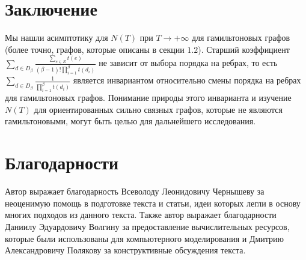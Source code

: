 \documentclass{article}
\newcommand{\squad}{
    \hspace{0.5em}
}
\begin{document}
\section{Заключение}

Мы нашли асимптотику для $N(T)$ при $T \to +\infty$ для гамильтоновых графов (более точно, графов, которые описаны в секции $1.2$).
Старший коэффициент $\sum_{d \in D_{\beta}}\frac{\sum_{e \in E}{t(e)}}{(\beta - 1)!\prod_{i = 1}^{\beta}{t(d_{i})}}$ не зависит от выбора порядка на ребрах, то есть $\sum_{d \in D_{\beta}}\frac{1}{\prod_{i = 1}^{\beta}{t(d_{i})}}$ является инвариантом относительно смены порядка на ребрах для гамильтоновых графов. Понимание природы этого инварианта и изучение $N(T)$ для ориентированных сильно связных графов, которые не являются гамильтоновыми, могут быть целью для дальнейшего исследования.

\section{Благодарности}
Автор выражает благодарность Всеволоду Леонидовичу Чернышеву за неоценимую помощь в подготовке текста и статьи, идеи которых легли в основу многих подходов из данного текста.
Также автор выражает благодарности Даниилу Эдуардовичу Волгину за предоставление вычислительных ресурсов, которые были использованы для компьютерного моделирования и Дмитрию Александровичу Полякову за конструктивные обсуждения текста.











\end{document}
